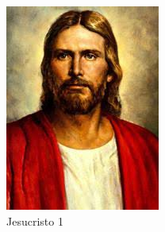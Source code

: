 \documentclass{article}
\begin{document}
\begin{figure}
    \begin{subfigure}{0.49\textwidth}
        \centering
        \includegraphics[width=\textwidth, heigth=10cm]{descarga.jpeg}
        \caption{Jesucristo 1 }
        \label{fig_2}
    \end{subfigure}
    \begin{subfigure}{0.49\textwidth}
        \centering

\end{subfigure}
\end{figure}
\end{document}

